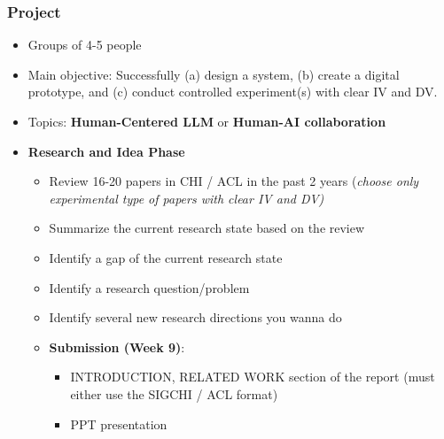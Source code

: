 \documentclass{beamer}
\begin{document}
\begin{frame}
\frametitle{Project}
\footnotesize
\begin{itemize}
	\item Groups of 4-5 people
	\item Main objective:  Successfully (a) design a system,  (b) create a digital prototype,  and (c) conduct controlled experiment(s) with clear IV and DV.   
    \item Topics:  \textbf{Human-Centered LLM} or \textbf{Human-AI collaboration}
	\item \textbf{Research and Idea Phase}
	\begin{itemize}
		\item Review 16-20 papers in CHI / ACL in the past 2 years (\textit{choose only experimental type of papers with clear IV and DV)}
		\item Summarize the current research state based on the review
		\item Identify a gap of the current research state
		\item Identify a research question/problem
		\item Identify several new research directions you wanna do
		\item \textbf{Submission (Week 9)}:
		\begin{itemize}
			\item  INTRODUCTION, RELATED WORK section of the report (must either use the SIGCHI / ACL format)
			\item PPT presentation
		\end{itemize}
	\end{itemize}
\end{itemize}
\end{frame}
\end{document}
